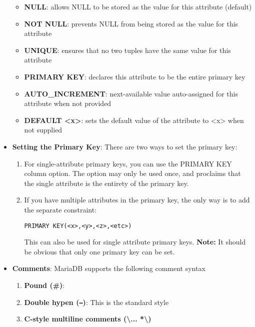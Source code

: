 \documentclass{report}
\begin{document}
\begin{itemize}
            \begin{itemize}
                \item \textbf{NULL}: allows NULL to be stored as the value for this attribute (default)
                \item \textbf{NOT NULL}: prevents NULL from being stored as the value for this attribute
                \item \textbf{UNIQUE}: ensures that no two tuples have the same value for this attribute
                \item \textbf{PRIMARY KEY}: declares this attribute to be the entire primary key
                \item \textbf{AUTO\_INCREMENT}: next-available value auto-assigned for this attribute when not provided
                \item \textbf{DEFAULT <x>}: sets the default value of the attribute to <x> when not supplied
            \end{itemize}
        \item \textbf{Setting the Primary Key}: There are two ways to set the primary key:
            \begin{enumerate}
                \item For single-attribute primary keys, you can use the PRIMARY KEY column option. The option may only be used once, and proclaims that the single attribute is the entirety of the primary key.
                \item If you have multiple attributes in the primary key, the only way is to add the separate constraint:
                    \begin{center}
                        \texttt{PRIMARY KEY(<x>,<y>,<z>,<etc>)}
                    \end{center}
                    \bigbreak \noindent 
                    This can also be used for single attribute primary keys.
                    \bigbreak \noindent 
                    \textbf{Note:} It should be obvious that only one primary key can be set.
            \end{enumerate}
        \item \textbf{Comments}: MariaDB supports the following comment syntax
            \begin{enumerate}
                \item \textbf{Pound (\#)}:
                \item \textbf{Double hypen (\texttt{--})}: This is the standard style
                \item \textbf{C-style multiline comments (\textbackslash * ... *\textbackslash)}

\end{enumerate}
\end{itemize}
\end{document}
